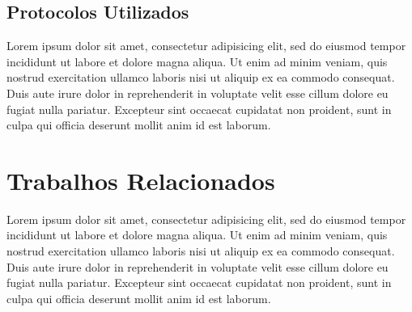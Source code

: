 \subsection{Protocolos Utilizados}

Lorem ipsum dolor sit amet, consectetur adipisicing elit, sed do eiusmod tempor incididunt ut labore et dolore magna aliqua. Ut enim ad minim veniam, quis nostrud exercitation ullamco laboris nisi ut aliquip ex ea commodo consequat. Duis aute irure dolor in reprehenderit in voluptate velit esse cillum dolore eu fugiat nulla pariatur. Excepteur sint occaecat cupidatat non proident, sunt in culpa qui officia deserunt mollit anim id est laborum.

\section{Trabalhos Relacionados}

Lorem ipsum dolor sit amet, consectetur adipisicing elit, sed do eiusmod tempor incididunt ut labore et dolore magna aliqua. Ut enim ad minim veniam, quis nostrud exercitation ullamco laboris nisi ut aliquip ex ea commodo consequat. Duis aute irure dolor in reprehenderit in voluptate velit esse cillum dolore eu fugiat nulla pariatur. Excepteur sint occaecat cupidatat non proident, sunt in culpa qui officia deserunt mollit anim id est laborum.

\label{sec:similares}
